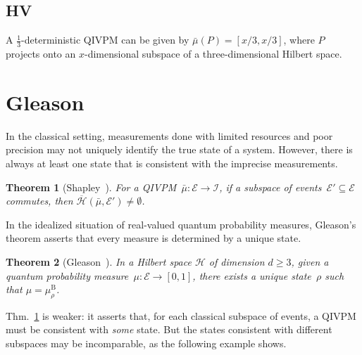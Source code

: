 \documentclass[english,reprint, aps, prl,superscriptaddress, showpacs,
showkeys, longbibliography, amsmath, amssymb]{revtex4-1}
\theoremstyle{plain}
\newtheorem{thm}{Theorem}
\theoremstyle{definition}
\newcommand{\Hilb}{\mathcal{H}}
\newcommand{\events}{\ensuremath{\mathcal{E}}}
\newcommand{\coreBorn}{\ensuremath{\overline{\Hilb}}}
\begin{document}
\subsection{HV}

A $\frac{1}{3}$-deterministic QIVPM can be given by
$\bar{\mu}\left(P\right)=\left[x/3,x/3\right]$, where $P$ projects
onto an $x$-dimensional subspace of a three-dimensional Hilbert space.

\section{Gleason}
\label{sec:Gleason}

In the classical setting, measurements done with limited resources and
poor precision may not uniquely identify the true state of a
system. However, there is always at least one state that is consistent
with the imprecise measurements.

\begin{thm}[Shapley~\cite{Shapley1971,GilboaSchmeidler1994,Grabisch2016}]\label{thm:Shapley}
  For a QIVPM~$\bar{\mu}:\events\rightarrow\mathscr{I}$, if a subspace
  of events~$\events'\subseteq\events$ commutes, then
  $\coreBorn\left(\bar{\mu},\events'\right)\ne\emptyset$.
\end{thm}

In the idealized situation of real-valued quantum probability
measures, Gleason's theorem asserts that every measure is determined
by a unique state. 

\begin{thm}[Gleason~\cite{gleason1957,Redhead1987-REDINA,peres1995quantum}]\label{cor:Gleason's}In
a Hilbert space $\Hilb$ of dimension $d\geq3$, given a quantum probability
measure~$\mu:\events\rightarrow[0,1]$, there exists a unique 
state~$\rho$ such that $\mu=\mu_{\rho}^{\mathrm{B}}$.
\end{thm}

Thm.~\ref{thm:Shapley} is weaker: it asserts that, for each classical
subspace of events, a QIVPM must be consistent with \emph{some}
state. But the states consistent with different subspaces may be
incomparable, as the following example shows.
\end{document}
